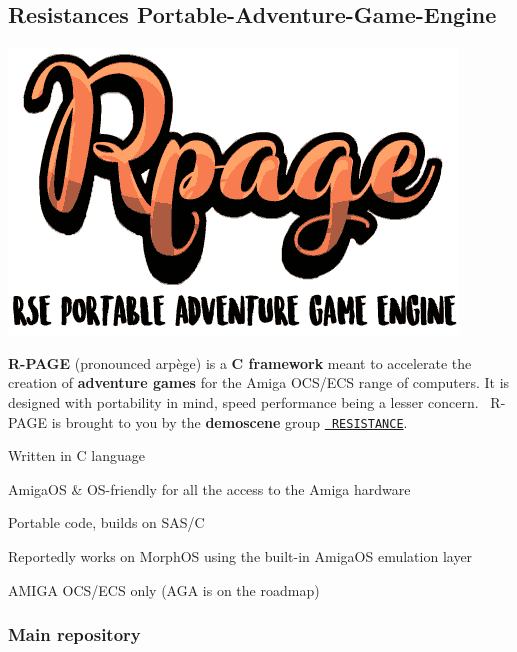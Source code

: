 \subsection*{Resistance\textquotesingle{}s Portable-\/\+Adventure-\/\+Game-\/\+Engine}

 
\begin{DoxyImageNoCaption}
  \mbox{\includegraphics[width=\textwidth,height=\textheight/2,keepaspectratio=true]{rpage_logo.png}}
\end{DoxyImageNoCaption}
  

{\bfseries{R-\/\+P\+A\+GE}} (pronounced \textquotesingle{}arpège\textquotesingle{}) is a {\bfseries{C framework}} meant to accelerate the creation of {\bfseries{adventure games}} for the Amiga O\+C\+S/\+E\+CS range of computers. It is designed with portability in mind, speed performance being a lesser concern.~\newline
 R-\/\+P\+A\+GE is brought to you by the {\bfseries{demoscene}} group \href{https://resistance.no/}{\texttt{ R\+E\+S\+I\+S\+T\+A\+N\+CE}}.


\begin{DoxyItemize}
\item Written in C language
\item Amiga\+OS \& O\+S-\/friendly for all the access to the Amiga hardware
\item Portable code, builds on S\+A\+S/C
\item Reportedly works on Morph\+OS using the built-\/in Amiga\+OS emulation layer
\item A\+M\+I\+GA O\+C\+S/\+E\+CS only (A\+GA is on the roadmap)
\end{DoxyItemize}

\subsubsection*{Main repository}

